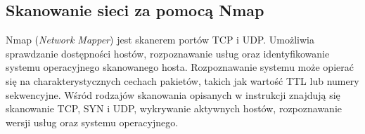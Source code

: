 \documentclass[11pt,a4paper]{article}
\begin{document}
\subsection*{Skanowanie sieci za pomocą Nmap}

Nmap (\textit{Network Mapper}) jest skanerem portów TCP i UDP. Umożliwia
sprawdzanie dostępności hostów, rozpoznawanie usług oraz identyfikowanie
systemu operacyjnego skanowanego hosta. Rozpoznawanie systemu może opierać
się na charakterystycznych cechach pakietów, takich jak wartość TTL lub
numery sekwencyjne. Wśród rodzajów skanowania opisanych w instrukcji
znajdują się skanowanie TCP, SYN i UDP, wykrywanie aktywnych hostów,
rozpoznawanie wersji usług oraz systemu operacyjnego.
\end{document}
